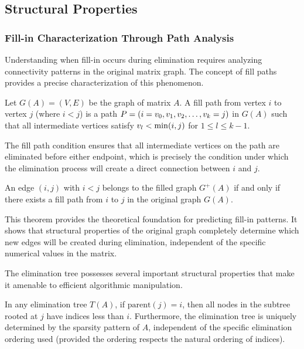 \subsection{Structural Properties}

\subsubsection{Fill-in Characterization Through Path Analysis}
Understanding when fill-in occurs during elimination requires analyzing connectivity patterns in the original matrix graph. The concept of fill paths provides a precise characterization of this phenomenon.

\begin{definition}
Let $G(A) = (V, E)$ be the graph of matrix $A$. A fill path from vertex $i$ to vertex $j$ (where $i < j$) is a path $P = (i = v\sb{0}, v\sb{1}, v\sb{2}, \ldots, v\sb{k} = j)$ in $G(A)$ such that all intermediate vertices satisfy $v\sb{l} < \min(i,j)$ for $1 \leq l \leq k-1$.
\end{definition}

The fill path condition ensures that all intermediate vertices on the path are eliminated before either endpoint, which is precisely the condition under which the elimination process will create a direct connection between $i$ and $j$.

\begin{theorem}
An edge $(i,j)$ with $i < j$ belongs to the filled graph $G^+(A)$ if and only if there exists a fill path from $i$ to $j$ in the original graph $G(A)$.
\end{theorem}

This theorem provides the theoretical foundation for predicting fill-in patterns. It shows that structural properties of the original graph completely determine which new edges will be created during elimination, independent of the specific numerical values in the matrix.

The elimination tree possesses several important structural properties that make it amenable to efficient algorithmic manipulation.

\begin{theorem}
In any elimination tree $T(A)$, if $\text{parent}(j) = i$, then all nodes in the subtree rooted at $j$ have indices less than $i$. Furthermore, the elimination tree is uniquely determined by the sparsity pattern of $A$, independent of the specific elimination ordering used (provided the ordering respects the natural ordering of indices).
\end{theorem}

